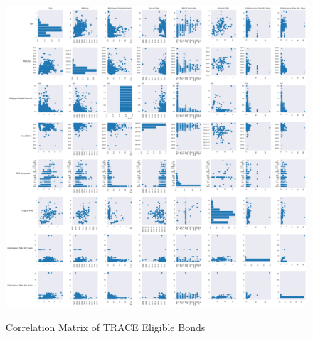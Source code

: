 \documentclass{article}
\begin{document}
\begin{figure}
\includegraphics[scale=0.2]{TRACECorrelationMatrix}
\centering
\label{fig:TRACECorrelation}
\caption{Correlation Matrix of TRACE Eligible Bonds}
\end{figure}


\newpage



\end{document}
